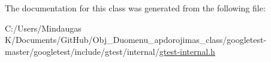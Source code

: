 The documentation for this class was generated from the following file\+:\begin{DoxyCompactItemize}
\item 
C\+:/\+Users/\+Mindaugas K/\+Documents/\+Git\+Hub/\+Obj\+\_\+\+Duomenu\+\_\+apdorojimas\+\_\+class/googletest-\/master/googletest/include/gtest/internal/\mbox{\hyperlink{googletest-master_2googletest_2include_2gtest_2internal_2gtest-internal_8h}{gtest-\/internal.\+h}}\end{DoxyCompactItemize}
